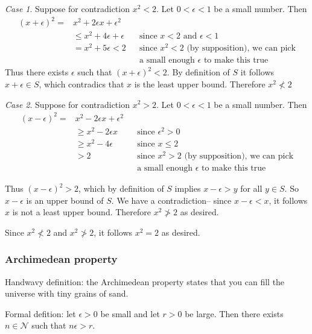 \vs

\textit{Case 1}. Suppose for contradiction $x^{2}<2$. Let $0<\epsilon<1$ be a
small number. Then
\begin{align*}
  {(x+\epsilon)}^{2}=&x^{2}+2\epsilon x+\epsilon^{2}\\
              &\leq x^{2}+4\epsilon+\epsilon&&\text{since $x<2$ and $\epsilon<1$}\\
              &=x^{2}+5\epsilon<2&&\text{since $x^{2}<2$ (by supposition), we
                             can pick}\\
              &&&\text{a small enough $\epsilon$ to make this true}
\end{align*}
Thus there exists $\epsilon$ such that ${(x+\epsilon)}^{2}<2$. By definition of
$S$ it follows $x+\epsilon\in S$, which contradics that $x$ is the least upper
bound. Therefore $x^{2}\not<2$

\vs

\textit{Case 2}. Suppose for contradiction $x^{2}>2$. Let $0<\epsilon<1$ be a
small number. Then
\begin{align*}
  {(x-\epsilon)}^{2}=&x^{2}-2\epsilon x+\epsilon^{2}\\
              &\geq x^{2}-2\epsilon x&&\text{since $\epsilon^{2}>0$}\\
              &\geq x^{2}-4\epsilon&&\text{since $x\leq2$}\\
              &>2&&\text{since $x^{2}>2$ (by supposition), we
                             can pick}\\
              &&&\text{a small enough $\epsilon$ to make this true}
\end{align*}

Thus ${(x-\epsilon)}^{2}>2$, which by definition of $S$ implies
$x-\epsilon>y$ for all $y\in S$. So $x-\epsilon$ is an upper bound of
$S$. We have a contradiction-- since $x-\epsilon<x$, it follows $x$ is not a
least upper bound. Therefore $x^{2}\not>2$ as desired.

\vs

Since $x^{2}\not<2$ and $x^{2}\not>2$, it follows $x^{2}=2$ as
desired.


\subsubsection*{Archimedean property}
Handwavy definition: the Archimedean property states that you can fill
the universe with tiny grains of sand.

\vs

Formal defition: let $\epsilon>0$ be small and let $r>0$ be large. Then there
exists $n\in\mathcal{N}$ such that $n\epsilon>r$.

